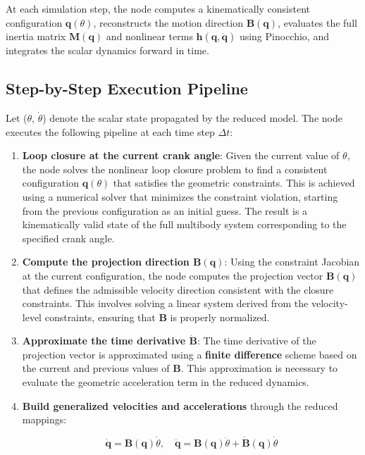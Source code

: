 At each simulation step, the node computes a kinematically consistent configuration $\textbf{q}(\theta)$, reconstructs the motion direction $\textbf{B}(\textbf{q})$, evaluates the full inertia matrix $\textbf{M}(\textbf{q})$ and nonlinear terms $\textbf{h}(\textbf{q},\dot{\textbf{q}})$ using Pinocchio, and integrates the scalar dynamics forward in time.

\subsection{Step-by-Step Execution Pipeline}
Let ($\theta$, $\dot{\theta}$) denote the scalar state propagated by the reduced model. The node executes the following pipeline at each time step $\Delta t$:

\begin{enumerate}
    \item \textbf{Loop closure at the current crank angle}: Given the current value of $\theta$, the node solves the nonlinear loop closure problem to find a consistent configuration $\textbf{q}(\theta)$ that satisfies the geometric constraints. This is achieved using a numerical solver that minimizes the constraint violation, starting from the previous configuration as an initial guess. The result is a kinematically valid state of the full multibody system corresponding to the specified crank angle.
    
    \item \textbf{Compute the projection direction $\textbf{B}(\textbf{q})$}: Using the constraint Jacobian at the current configuration, the node computes the projection vector $\textbf{B}(\textbf{q})$ that defines the admissible velocity direction consistent with the closure constraints. This involves solving a linear system derived from the velocity-level constraints, ensuring that $\textbf{B}$ is properly normalized.
    
    \item \textbf{Approximate the time derivative $\dot{\textbf{B}}$}: The time derivative of the projection vector is approximated using a \textbf{finite difference} scheme based on the current and previous values of $\textbf{B}$. This approximation is necessary to evaluate the geometric acceleration term in the reduced dynamics.
    
    \item \textbf{Build generalized velocities and accelerations} through the reduced mappings: 
    
    \begin{equation*}
        \dot{\textbf{q}} = \textbf{B}(\textbf{q})\dot{\theta}, \quad \ddot{\textbf{q}} = \textbf{B}(\textbf{q})\ddot{\theta} + \dot{\textbf{B}}(\textbf{q})\dot{\theta}
    \end{equation*}


\end{enumerate}
